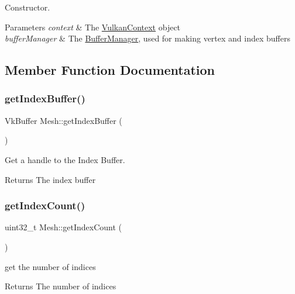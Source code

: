 Constructor. 


\begin{DoxyParams}{Parameters}
{\em context} & The \mbox{\hyperlink{class_vulkan_context}{Vulkan\+Context}} object \\
\hline
{\em buffer\+Manager} & The \mbox{\hyperlink{class_buffer_manager}{Buffer\+Manager}}, used for making vertex and index buffers \\
\hline
\end{DoxyParams}


\subsection{Member Function Documentation}
\mbox{\label{class_mesh_a7f8c80d74ef174adef3bc5b56aa715af}} 
\subsubsection{\texorpdfstring{getIndexBuffer()}{getIndexBuffer()}}
{\footnotesize\ttfamily Vk\+Buffer Mesh\+::get\+Index\+Buffer (\begin{DoxyParamCaption}{ }\end{DoxyParamCaption})}



Get a handle to the Index Buffer. 

\begin{DoxyReturn}{Returns}
The index buffer 
\end{DoxyReturn}
\mbox{\label{class_mesh_a6dde20eaf4e25eba5cd13918e269445a}} 
\subsubsection{\texorpdfstring{getIndexCount()}{getIndexCount()}}
{\footnotesize\ttfamily uint32\+\_\+t Mesh\+::get\+Index\+Count (\begin{DoxyParamCaption}{ }\end{DoxyParamCaption})}



get the number of indices 

\begin{DoxyReturn}{Returns}
The number of indices 
\end{DoxyReturn}
\mbox{\label{class_mesh_a2c18dc0f46962bfa01d274d632cd1242}} 
